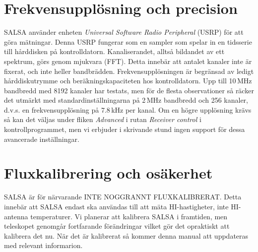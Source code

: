 \section{Frekvensupplösning och precision}
SALSA använder enheten \emph{Universal Software Radio Peripheral} (USRP) för
att göra mätningar. Denna USRP fungerar som en sampler som spelar in en
tidsserie till hårddisken på kontrolldatorn. Kanaliserandet, alltså bildandet
av ett spektrum, görs genom mjukvara (FFT). Detta innebär att antalet kanaler
inte är fixerat, och inte heller bandbrädden. Frekvensupplösningen är begränsad
av ledigt hårddiskutrymme och beräkningskapaciteten hos kontrolldatorn. Upp
till 10\,MHz bandbredd med 8192 kanaler har testats, men för de flesta
observationer så räcker det utmärkt med standardinställningarna på 2\,MHz
bandbredd och 256 kanaler, d.v.s. en frekvensupplösning på 7.8\,kHz per kanal.
Om en högre upplösning krävs så kan det väljas under fliken \emph{Advanced} i
rutan \emph{Receiver control} i kontrollprogrammet, men vi erbjuder i skrivande
stund ingen support för dessa avancerade inställningar. 

\section{Fluxkalibrering och osäkerhet}
SALSA är för närvarande INTE NOGGRANNT FLUXKALIBRERAT. Detta innebär att SALSA endast ska användas till att mäta HI-hastigheter, inte HI-antenna temperaturer. Vi planerar att kalibrera SALSA i framtiden, men teleskopet genomgår fortfarande förändringar vilket gör det opraktiskt att kalibrera det nu. När det är kalibrerat så kommer denna manual att uppdateras med relevant informarion. 
